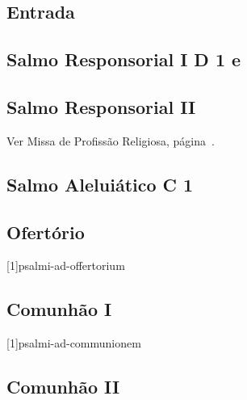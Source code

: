 
\subsection{Entrada}\label{subsection:missae-pro-varii-necessitatibus/pro-vocationibus/introitus}

\subsection[Salmo Responsorial I]{Salmo Responsorial I \textmd{D 1 e}}\label{subsection:missae-pro-varii-necessitatibus/pro-vocationibus/psalmus-responsorius}

\subsection{Salmo Responsorial II}
\begin{rubrica}
  Ver Missa de Profissão Religiosa, página~\pageref{subsection:missas-rituales/missa-in-professione-religiosa/psalmus-responsorius-2}.
\end{rubrica}

\AllowPageFlush

\subsection[Salmo Aleluiático]{Salmo Aleluiático \textmd{C 1}}\label{subsection:missae-pro-varii-necessitatibus/pro-vocationibus/psalmus-alleluiaticus}

\AllowPageFlush

\subsection{Ofertório}\label{subsection:missae-pro-varii-necessitatibus/pro-vocationibus/offertorium}
[1]{psalmi-ad-offertorium}

\AllowPageFlush

\subsection{Comunhão I}\label{subsection:missae-pro-varii-necessitatibus/pro-vocationibus/communio-1}
[1]{psalmi-ad-communionem}

\AllowPageBreak

\subsection{Comunhão II}\label{subsection:missae-pro-varii-necessitatibus/pro-vocationibus/communio-2}
